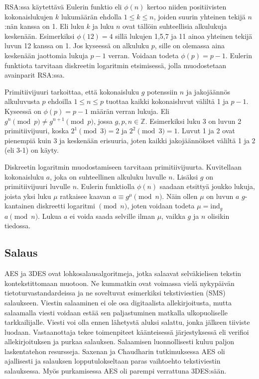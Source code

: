 \documentclass[finnish]{tktltiki2}
\theoremstyle{definition}
\theoremstyle{remark}
\begin{document}
RSA:ssa käytettävä Eulerin funktio eli $\phi(n)$ kertoo niiden positiivisten kokonaislukujen $k$ lukumäärän ehdolla $1 \leq k \leq n$, joiden suurin yhteinen tekijä $n$:nän kanssa on 1. Eli luku $k$ ja luku $n$ ovat tällöin suhteellisia alkulukuja keskenään. Esimerkiksi $\phi(12) = 4$ sillä lukujen 1,5,7 ja 11 ainoa yhteinen tekijä luvun 12 kanssa on 1. Jos kyseessä on alkuluku $p$, sille on olemassa aina  keskenään jaottomia lukuja $p - 1$ verran. Voidaan todeta $\phi(p) = p -1$. Eulerin funktiota tarvitaan diskreetin logaritmin etsimisessä, jolla muodostetaan avainparit RSA:ssa. \cite{tot}
	
Primitiivijuuri tarkoittaa, että kokonaisluku $g$ potenssiin $n$ ja jakojäännös alkuluvusta $p$ ehdoilla $1 \leq n \leq p$ tuottaa kaikki kokonaisluvut väliltä 1 ja $p-1$. Kyseessä on $\phi(p) = p - 1$ määrän verran lukuja. Eli $g^n \pmod{p} \neq g^{n+1} \pmod{p}$, jossa $g, p, n \in \mathbb{Z}$. Esimerkiksi luku 3 on luvun 2 primitiivijuuri, koska $2^1 \pmod{3} = 2$ ja $2^2 \pmod{3} = 1$. Luvut 1 ja 2 ovat pienempiä kuin 3 ja keskenään erisuuria, joten kaikki jakojäännökset väliltä 1 ja 2 (eli 3-1) on käyty. \cite{prim}

Diskreetin logaritmin muodostamiseen tarvitaan primitiivijuurta. Kuvitellaan kokonaisluku $a$, joka on suhteellinen alkuluku luvulle $n$. Lisäksi $g$ on primitiivijuuri luvulle $n$. Eulerin funktiolla $\phi(n)$ saadaan etsittyä joukko lukuja, joista yksi luku $\mu$ ratkaisee kaavan  $a \equiv g^{\mu} \pmod{n}$. Näin ollen $\mu$ on luvun $a$ $g$-kantainen diskreetti logaritmi $\pmod{n}$, joten voidaan todeta $\mu = $ind$_g$ $a\pmod{n}$. Lukua $a$ ei voida saada selville ilman $\mu$, vaikka $g$ ja $n$ olisikin tiedossa. \cite{disc}

\subsection{Salaus} 

AES ja 3DES ovat lohkosalausalgoritmeja, jotka salaavat selväkielisen tekstin kontekstittomaan muotoon. Ne kummatkin ovat voimassa vielä nykypäivän tietoturvastandardeissa ja ne soveltuvat esimerkiksi tekstiviestien (SMS) salaukseen. Viestin salaaminen ei ole osa digitaalista allekirjoitusta, mutta salaamalla viesti voidaan estää sen paljastuminen matkalla ulkopuoliselle tarkkailijalle. Viesti voi olla ennen lähetystä aluksi salattu, jonka jälkeen tiiviste luodaan. Vastaanottaja tekee toimenpiteet käänteisessä järjestyksessä eli verifioi allekirjoituksen ja purkaa salauksen. Salaamisen luonnollisesti kuluu paljon laskentatehon resursseja. Saxenan ja Chaudharin tutkimuksessa AES oli ajallisesti ja salauksen lopputulokseltaan paras vaihtoehto tekstiviestin salauksessa. Myös purkamisessa AES oli parempi verrattuna 3DES:sään. \cite{gsm}
\end{document}
